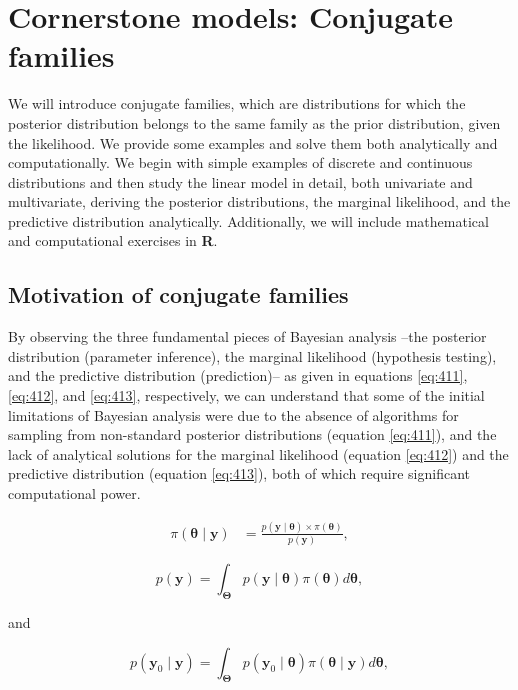 \chapter{Cornerstone models: Conjugate families}\label{chap4}

We will introduce conjugate families, which are distributions for which the posterior distribution belongs to the same family as the prior distribution, given the likelihood. We provide some examples and solve them both analytically and computationally. We begin with simple examples of discrete and continuous distributions and then study the linear model in detail, both univariate and multivariate, deriving the posterior distributions, the marginal likelihood, and the predictive distribution analytically. Additionally, we will include mathematical and computational exercises in \textbf{R}.

\section{Motivation of conjugate families}\label{sec41}
By observing the three fundamental pieces of Bayesian analysis --the posterior distribution (parameter inference), the marginal likelihood (hypothesis testing), and the predictive distribution (prediction)-- as given in equations \ref{eq:411}, \ref{eq:412}, and \ref{eq:413}, respectively, we can understand that some of the initial limitations of Bayesian analysis were due to the absence of algorithms for sampling from non-standard posterior distributions (equation \ref{eq:411}), and the lack of analytical solutions for the marginal likelihood (equation \ref{eq:412}) and the predictive distribution (equation \ref{eq:413}), both of which require significant computational power.


\begin{align}
	\pi(\bm{\theta}\mid \bm{y})&=\frac{p(\bm{y}\mid \bm{\theta}) \times \pi(\bm{\theta})}{p(\bm{y})},
	\label{eq:411}
\end{align}

\begin{equation}
	p(\bm{y})=\int_{\bm{\Theta}}p(\bm{y}\mid \bm{\theta})\pi(\bm{\theta})d\bm{\theta},
	\label{eq:412}
\end{equation}

and 

\begin{equation}
	p(\bm{y}_0\mid \bm{y})=\int_{\bm{\Theta}}p(\bm{y}_0\mid \bm{\theta})\pi(\bm{\theta}\mid \bm{y})d\bm{\theta},
	\label{eq:413}
\end{equation}

